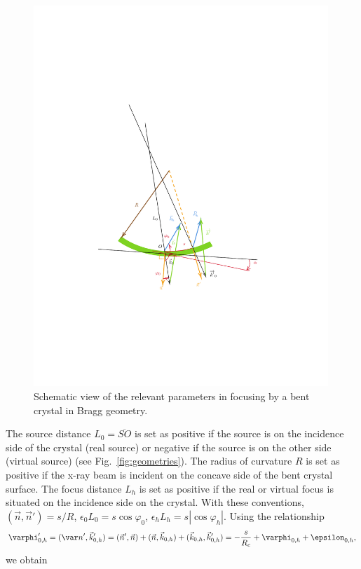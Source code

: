 \documentclass[preprint]{iucr}              %
\begin{document}
\begin{figure}
\label{fig:vectors}
\caption{Schematic view of the relevant parameters in focusing by a bent crystal in Bragg geometry.
}
\includegraphics[width=0.99\textwidth,trim=4cm 6cm 5cm 10cm,clip=true]{fig2.pdf}
\end{figure}

The source distance $L_0=\overline{SO}$ is set as positive if the source is on the incidence side of the crystal (real source) or negative if the source is on the other side (virtual source) (see Fig.~\ref{fig:geometries}). The radius of curvature $R$ is set as positive if the x-ray beam is incident on the concave side of the bent crystal surface. The focus distance $L_h$ is set as positive if the real or virtual focus is situated on the incidence side on the crystal. With these conventions, $(\vec n,\vec n')=s/R$, $\epsilon_0 L_0 = s \cos\varphi_0$,  $\epsilon_h L_h = s |\cos\varphi_h|$. Using the relationship
\begin{equation}
    \varphi'_{0,h} = 
    (\var n',  \vec k'_{0,h}) = 
    (\vec n', \vec n) + (\vec n,\vec k_{0,h}) + (\vec k_{0,h}, \vec k'_{0,h}) = -\frac{s}{R_c} + \varphi_{0,h} + \epsilon_{0,h},
\end{equation}
we obtain
\end{document}
